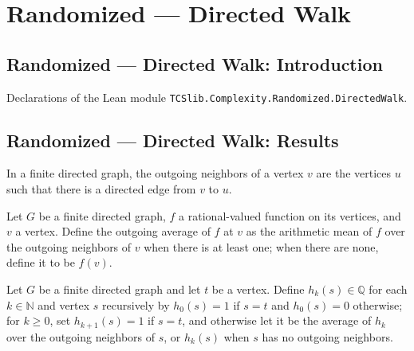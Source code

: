 \section{Randomized --- Directed Walk}
\subsection*{Randomized --- Directed Walk: Introduction}

Declarations of the Lean module \texttt{TCSlib.Complexity.Randomized.DirectedWalk}.

\subsection*{Randomized --- Directed Walk: Results}

\begin{definition}
\label{Randomized.outNbrs}
\leanok
In a finite directed graph, the outgoing neighbors of a vertex $v$ are the vertices $u$
such that there is a directed edge from $v$ to $u$.
\end{definition}

\begin{definition}
\label{Randomized.avgOut}
\leanok
{}
Let $G$ be a finite directed graph, $f$ a rational-valued function on its vertices, and
$v$ a vertex. Define the outgoing average of $f$ at $v$ as the arithmetic mean of $f$
over the outgoing neighbors of $v$ when there is at least one; when there are none,
define it to be $f(v)$.
\end{definition}

\begin{definition}
\label{Randomized.hitProb}
\leanok
{}
Let $G$ be a finite directed graph and let $t$ be a vertex. Define $h_k(s)\in\mathbb{Q}$
for each $k\in\mathbb{N}$ and vertex $s$ recursively by $h_0(s)=1$ if $s=t$ and
$h_0(s)=0$ otherwise; for $k\geq 0$, set $h_{k+1}(s)=1$ if $s=t$, and otherwise let it
be the average of $h_k$ over the outgoing neighbors of $s$, or $h_k(s)$ when $s$ has no
outgoing neighbors.
\end{definition}

